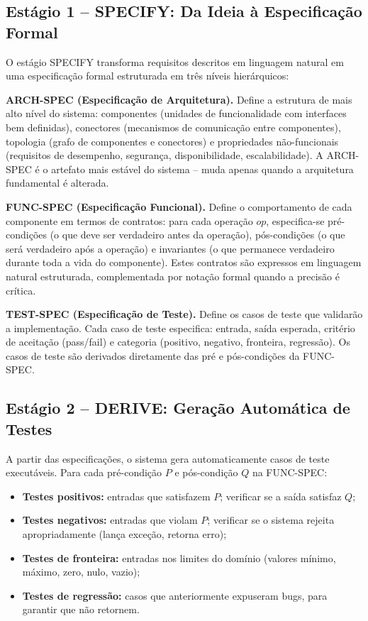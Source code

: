 \documentclass[12pt,a4paper,sumario=tradicional,openany]{abntex2}
\begin{document}
\subsection{Estágio 1 -- SPECIFY: Da Ideia à Especificação Formal}

O estágio SPECIFY transforma requisitos descritos em linguagem natural em uma especificação formal estruturada em três níveis hierárquicos:

\textbf{ARCH-SPEC (Especificação de Arquitetura).} Define a estrutura de mais alto nível do sistema: componentes (unidades de funcionalidade com interfaces bem definidas), conectores (mecanismos de comunicação entre componentes), topologia (grafo de componentes e conectores) e propriedades não-funcionais (requisitos de desempenho, segurança, disponibilidade, escalabilidade). A ARCH-SPEC é o artefato mais estável do sistema -- muda apenas quando a arquitetura fundamental é alterada.

\textbf{FUNC-SPEC (Especificação Funcional).} Define o comportamento de cada componente em termos de contratos: para cada operação $op$, especifica-se pré-condições (o que deve ser verdadeiro antes da operação), pós-condições (o que será verdadeiro após a operação) e invariantes (o que permanece verdadeiro durante toda a vida do componente). Estes contratos são expressos em linguagem natural estruturada, complementada por notação formal quando a precisão é crítica.

\textbf{TEST-SPEC (Especificação de Teste).} Define os casos de teste que validarão a implementação. Cada caso de teste especifica: entrada, saída esperada, critério de aceitação (pass/fail) e categoria (positivo, negativo, fronteira, regressão). Os casos de teste são derivados diretamente das pré e pós-condições da FUNC-SPEC.

\subsection{Estágio 2 -- DERIVE: Geração Automática de Testes}

A partir das especificações, o sistema gera automaticamente casos de teste executáveis. Para cada pré-condição $P$ e pós-condição $Q$ na FUNC-SPEC:

\begin{itemize}
    \item \textbf{Testes positivos:} entradas que satisfazem $P$; verificar se a saída satisfaz $Q$;
    \item \textbf{Testes negativos:} entradas que violam $P$; verificar se o sistema rejeita apropriadamente (lança exceção, retorna erro);
    \item \textbf{Testes de fronteira:} entradas nos limites do domínio (valores mínimo, máximo, zero, nulo, vazio);
    \item \textbf{Testes de regressão:} casos que anteriormente expuseram bugs, para garantir que não retornem.
\end{itemize}
\end{document}
